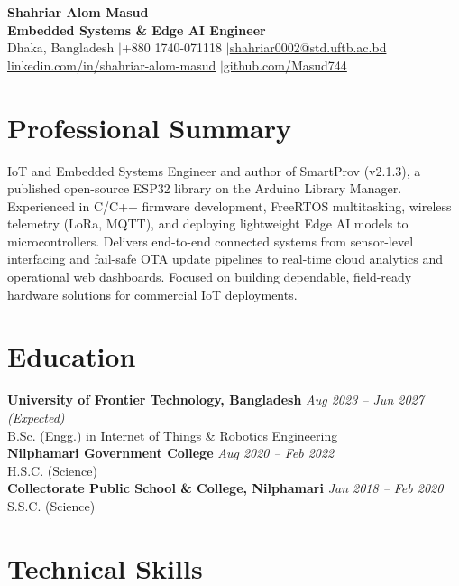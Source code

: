 \documentclass[11pt,a4paper]{article}
\begin{document}
\begin{center}
    {\LARGE \textbf{Shahriar Alom Masud}} \\
    \vspace{2pt}
    \textbf{Embedded Systems \& Edge AI Engineer} \\
    \vspace{2pt}
    \small
    Dhaka, Bangladesh \enspace$|$\enspace +880 1740-071118 \enspace$|$\enspace \href{mailto:shahriar0002@std.uftb.ac.bd}{shahriar0002@std.uftb.ac.bd} \\
    \href{https://www.linkedin.com/in/shahriar-alom-masud}{linkedin.com/in/shahriar-alom-masud} \enspace$|$\enspace \href{https://github.com/Masud744}{github.com/Masud744}
\end{center}

\section*{Professional Summary}
IoT and Embedded Systems Engineer and author of SmartProv (v2.1.3), a published open-source ESP32 library on the Arduino Library Manager. Experienced in C/C++ firmware development, FreeRTOS multitasking, wireless telemetry (LoRa, MQTT), and deploying lightweight Edge AI models to microcontrollers. Delivers end-to-end connected systems from sensor-level interfacing and fail-safe OTA update pipelines to real-time cloud analytics and operational web dashboards. Focused on building dependable, field-ready hardware solutions for commercial IoT deployments.

\section*{Education}

\textbf{University of Frontier Technology, Bangladesh} \hfill \textit{Aug 2023 -- Jun 2027 (Expected)} \\
B.Sc. (Engg.) in Internet of Things \& Robotics Engineering \\
\textbf{Nilphamari Government College} \hfill \textit{Aug 2020 -- Feb 2022} \\
H.S.C. (Science) \\
\textbf{Collectorate Public School \& College, Nilphamari} \hfill \textit{Jan 2018 -- Feb 2020} \\
S.S.C. (Science)

\section*{Technical Skills}
\end{document}
